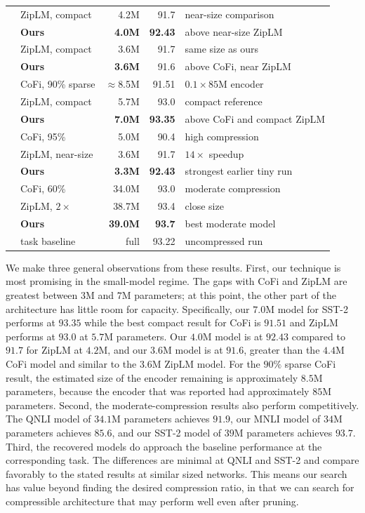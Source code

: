 \begin{table}[H]
\begin{tabular}{llrrl}
& ZipLM, compact & 4.2M  & 91.7  & near-size comparison \\
& \textbf{Ours} & \textbf{4.0M}  & \textbf{92.43} & above near-size ZipLM \\
& ZipLM, compact & 3.6M  & 91.7  & same size as ours \\
& \textbf{Ours} & \textbf{3.6M}  & 91.6 & above CoFi, near ZipLM \\
& CoFi, 90\% sparse & $\approx$8.5M & 91.51 & $0.1 \times 85$M encoder \\
& ZipLM, compact & 5.7M  & 93.0  & compact reference \\
& \textbf{Ours} & \textbf{7.0M}  & \textbf{93.35} & above CoFi and compact ZipLM \\
& CoFi, 95\% & 5.0M  & 90.4  & high compression \\
& ZipLM, near-size & 3.6M  & 91.7  & $14\times$ speedup \\
& \textbf{Ours} & \textbf{3.3M}  & \textbf{92.43} & strongest earlier tiny run \\
& CoFi, 60\% & 34.0M & 93.0  & moderate compression \\
& ZipLM, $2\times$ & 38.7M & 93.4  & close size \\
& \textbf{Ours} & \textbf{39.0M} & \textbf{93.7}  & best moderate model \\
& task baseline & full  & 93.22 & uncompressed run \\
\bottomrule
\end{tabular}
\end{table}
We make three general observations from these results. First, our technique is  most promising in the small-model regime. The gaps with CoFi and ZipLM are greatest between $3$M and $7$M parameters; at this point, the other part of the architecture has little room for capacity. Specifically, our $7.0$M model for SST-2 performs at $93.35$ while the best compact result for CoFi is $91.51$ and ZipLM performs at $93.0$ at $5.7$M parameters. Our $4.0$M model is at $92.43$ compared to $91.7$ for ZipLM at $4.2$M, and our $3.6$M model is at $91.6$, greater than the $4.4$M CoFi model and similar to the $3.6$M ZipLM model. For the $90\%$ sparse CoFi result, the estimated size of the encoder remaining is approximately $8.5$M parameters, because the encoder that was reported had approximately $85$M parameters. Second, the moderate-compression results also perform competitively. The QNLI model of $34.1$M parameters achieves $91.9$, our MNLI model of $34$M parameters achieves $85.6$, and our SST-2 model of $39$M parameters achieves $93.7$. Third, the recovered models do approach the baseline performance at the corresponding task. The differences are minimal at QNLI and SST-2 and compare favorably to the stated results at similar sized networks. This means our search has value beyond finding the desired compression ratio, in that we can search for compressible architecture that may perform well even after pruning.
